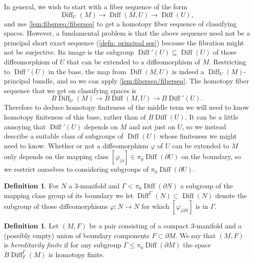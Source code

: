 \documentclass{amsart}
\theoremstyle{plain}
\theoremstyle{definition}
\newtheorem{defn}[thm]{Definition}
\DeclareMathOperator\Diff{Diff}
\newcommand{\BDiff}{B\!\Diff}
\begin{document}
In general, we wish to start with a fiber sequence of the form
\[  
    \Diff_U(M) \longrightarrow \Diff(M, U) \longrightarrow \Diff(U),
\]
and use \cref{lem:fiberseq/fiberseq} to get a homotopy fiber sequence of classifying spaces.
However, a fundamental problem is that the above sequence need not be a principal short exact sequence (\cref{defn: principal ses}) because the fibration might not be surjective.
Its image is the subgroup $\Diff'(U) \subseteq \Diff(U)$ of those diffeomorphism of $U$ that can be extended to a diffeomorphism of $M$. Restricting to $\Diff'(U)$ in the base, the map from $\Diff(M,U)$ is indeed a $\Diff_U(M)$-principal bundle, and so we can apply \cref{lem:fiberseq/fiberseq}.
The homotopy fiber sequence that we get on classifying spaces is
\[
    \BDiff_U(M) \longrightarrow \BDiff(M, U) \longrightarrow \BDiff'(U).
\]
Therefore to deduce homotopy finiteness of the middle term we will need to know homotopy finiteness of this base, rather than of $\BDiff(U)$.
It can be a little annoying that $\Diff'(U)$ depends on $M$ and not just on $U$, so we instead describe a suitable class of subgroups of $\Diff(U)$ whose finiteness we might need to know.
Whether or not a diffeomorphism $\varphi$ of $U$ can be extended to $M$ only depends on the mapping class $[\varphi_{|\partial}] \in \pi_0\Diff(\partial U)$ on the boundary, so we restrict ourselves to considering subgroups of $\pi_0\Diff(\partial U)$.

\begin{defn}\label{defn:Diff-Gamma}
    For $N$ a $3$-manifold and $\Gamma < \pi_0\Diff(\partial N)$ a subgroup of the mapping class group of its boundary we let $\Diff^\Gamma(N) \subset \Diff(N)$ denote the subgroup of those diffeomorphisms $\varphi\colon N \to N$ for which $[\varphi_{|\partial N}]$  is in $\Gamma$.
\end{defn}


\begin{defn}\label{defn:hereditarily-finite}
    Let $(M, F)$ be a pair consisting of a compact $3$-manifold and a (possibly empty) union of boundary components $F \subset \partial M$.
    We say that $(M, F)$ is \emph{hereditarily finite} if for any subgroup $\Gamma \le \pi_0\Diff(\partial M)$ the space
    $\BDiff_F^\Gamma(M)$ 
    is homotopy finite.
\end{defn}
\end{document}
